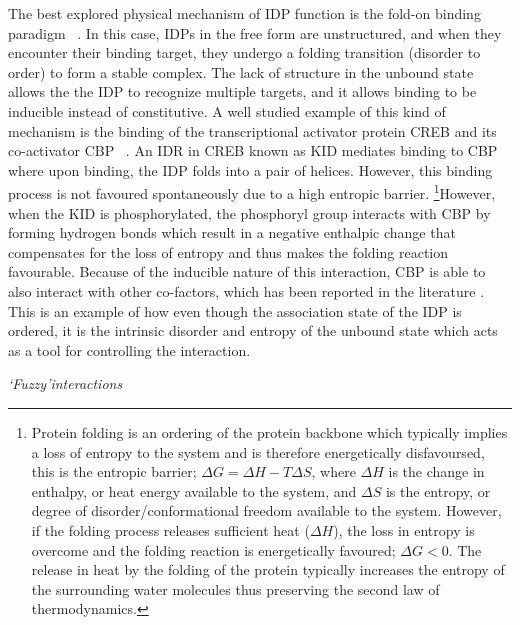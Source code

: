 The best explored physical mechanism of IDP function is the fold-on binding paradigm ~\cite{wright2009linking}. In this case, IDPs in the free form are unstructured, and when they encounter their binding target, they undergo a folding transition (disorder to order) to form a stable complex. The lack of structure in the unbound state allows the the IDP to recognize multiple targets, and it allows binding to be inducible instead of constitutive. A well studied example of this kind of mechanism is the binding of the transcriptional activator protein CREB and its co-activator CBP ~\cite{gianni2012folding}. An IDR in CREB known as KID mediates binding to CBP where upon binding, the IDP folds into a pair of helices. However, this binding process is not favoured spontaneously due to a high entropic barrier. \footnote{Protein folding is an ordering of the protein backbone which typically implies a loss of entropy to the system and is therefore energetically disfavoursed, this is the entropic barrier; $\Delta G = \Delta H - T\Delta S$, where $\Delta H$ is the change in enthalpy, or heat energy available to the system, and $\Delta S$ is the entropy, or degree of disorder/conformational freedom available to the system. However, if the folding process releases sufficient heat ($\Delta H$), the loss in entropy is overcome and the folding reaction is energetically favoured; $\Delta G < 0$. The release in heat by the folding of the protein typically increases the entropy of the surrounding water molecules thus preserving the second law of thermodynamics.}However, when the KID is phosphorylated, the phosphoryl group interacts with CBP by forming hydrogen bonds which result in a negative enthalpic change that compensates for the loss of entropy and thus makes the folding reaction favourable. Because of the inducible nature of this interaction, CBP is able to also interact with other co-factors, which has been reported in the literature \cite{radhakrishnan1997solution}. This is an example of how even though the association state of the IDP is ordered, it is  the intrinsic disorder and entropy of the unbound state which acts as a tool for controlling the interaction. \\


\pagebreak

{\it \lq Fuzzy\rq interactions}

